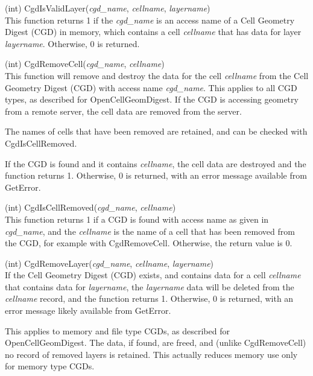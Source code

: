 \begin{description}
\item{(int) \vt CgdIsValidLayer({\it cgd\_name\/}, {\it cellname\/},
 {\it layername\/})}\\
This function returns 1 if the {\it cgd\_name} is an access name of a
Cell Geometry Digest (CGD) in memory, which contains a cell {\it
cellname} that has data for layer {\it layername}.  Otherwise, 0 is
returned.

\item{(int) \vt CgdRemoveCell({\it cgd\_name\/}, {\it cellname\/})}\\
This function will remove and destroy the data for the cell {\it
cellname} from the Cell Geometry Digest (CGD) with access name {\it
cgd\_name\/}.  This applies to all CGD types, as described for {\vt
OpenCellGeomDigest}.  If the CGD is accessing geometry from a remote
server, the cell data are removed from the server.

The names of cells that have been removed are retained, and can be
checked with {\vt CgdIsCellRemoved}.

If the CGD is found and it contains {\it cellname\/}, the cell data
are destroyed and the function returns 1.  Otherwise, 0 is returned,
with an error message available from {\vt GetError}.

\item{(int) \vt CgdIsCellRemoved({\it cgd\_name\/}, {\it cellname\/})}\\
This function returns 1 if a CGD is found with access name as given in
{\it cgd\_name}, and the {\it cellname} is the name of a cell that has
been removed from the CGD, for example with {\vt CgdRemoveCell}. 
Otherwise, the return value is 0.

\item{(int) \vt CgdRemoveLayer({\it cgd\_name\/}, {\it cellname\/},
 {\it layername\/})}\\
If the Cell Geometry Digest (CGD) exists, and contains data for a cell
{\it cellname} that contains data for {\it layername\/}, the {\it
layername} data will be deleted from the {\it cellname} record, and
the function returns 1.  Otherwise, 0 is returned, with an error
message likely available from {\vt GetError}.

This applies to memory and file type CGDs, as described for {\vt
OpenCellGeomDigest}.  The data, if found, are freed, and (unlike {\vt
CgdRemoveCell}) no record of removed layers is retained.  This
actually reduces memory use only for memory type CGDs.


\end{description}
